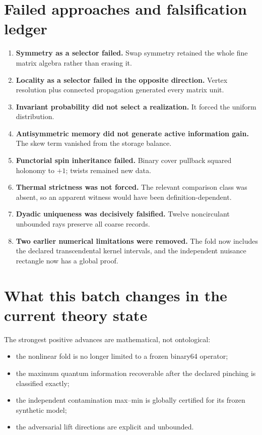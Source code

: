 \documentclass[11pt,a4paper]{article}
\begin{document}
\section{Failed approaches and falsification ledger}

\begin{enumerate}
\item \textbf{Symmetry as a selector failed.} Swap symmetry retained the whole fine matrix algebra rather than erasing it.
\item \textbf{Locality as a selector failed in the opposite direction.} Vertex resolution plus connected propagation generated every matrix unit.
\item \textbf{Invariant probability did not select a realization.} It forced the uniform distribution.
\item \textbf{Antisymmetric memory did not generate active information gain.} The skew term vanished from the storage balance.
\item \textbf{Functorial spin inheritance failed.} Binary cover pullback squared holonomy to $+1$; twists remained new data.
\item \textbf{Thermal strictness was not forced.} The relevant comparison class was absent, so an apparent witness would have been definition-dependent.
\item \textbf{Dyadic uniqueness was decisively falsified.} Twelve noncirculant unbounded rays preserve all coarse records.
\item \textbf{Two earlier numerical limitations were removed.} The fold now includes the declared transcendental kernel intervals, and the independent nuisance rectangle now has a global proof.
\end{enumerate}

\section{What this batch changes in the current theory state}

The strongest positive advances are mathematical, not ontological:
\begin{itemize}
\item the nonlinear fold is no longer limited to a frozen binary64 operator;
\item the maximum quantum information recoverable after the declared pinching is classified exactly;
\item the independent contamination max--min is globally certified for its frozen synthetic model;
\item the adversarial lift directions are explicit and unbounded.
\end{itemize}
\end{document}
